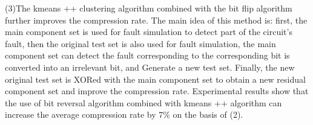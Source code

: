 {(3)The kmeans ++ clustering algorithm combined with the bit flip algorithm further improves the compression rate. The main idea of this method is: first, the main component set is used for fault simulation to detect part of the circuit's fault, then the original test set is also used for fault simulation, the main component set can detect the fault corresponding to the corresponding bit is converted into an irrelevant bit, and Generate a new test set. Finally, the new original test set is XORed with the main component set to obtain a new residual component set and improve the compression rate. Experimental results show that the use of bit reversal algorithm combined with kmeans ++ algorithm can increase the average compression rate by 7\% on the basis of (2).
}
\makecover
\clearpage
